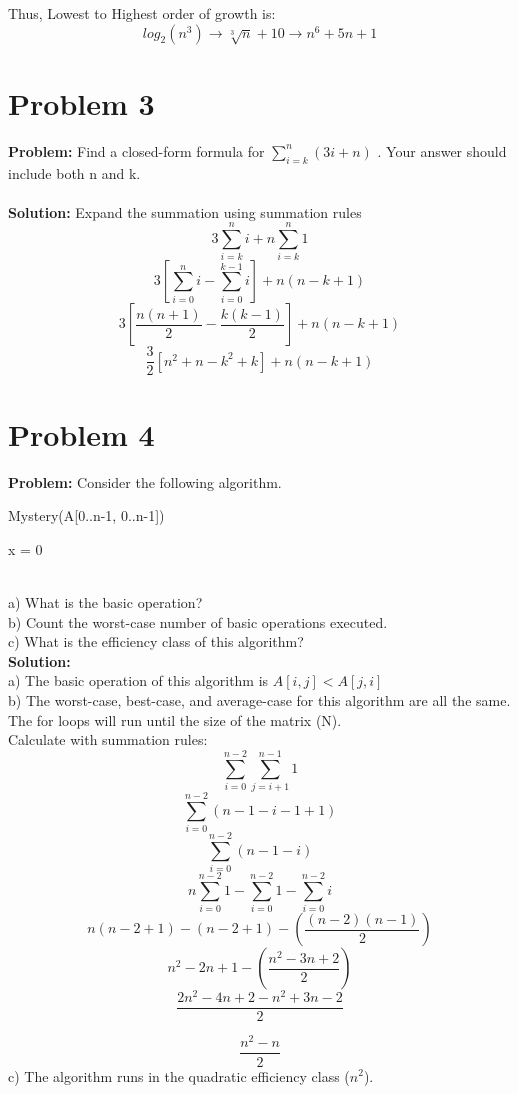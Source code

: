 \documentclass{article}
\begin{document}
Thus, Lowest to Highest order of growth is: \[log_2(n^3) \to \sqrt[3]{n} + 10 \to n^6 +5n +1\]

\section{Problem 3}
\textbf{Problem: }
Find a closed-form formula for $\sum_{i=k}^{n} (3i+n)$ . Your answer should include both n and k. \\
\\
\textbf{Solution: }
Expand the summation using summation rules
\[3 \sum_{i=k}^{n} i + n \sum_{i=k}^{n} 1 \]
\[3[\sum_{i=0}^{n}i - \sum_{i=0}^{k-1}i ] + n(n-k+1) \]
\[3[\frac{n(n+1)}{2} - \frac{k(k-1)}{2}] + n(n-k+1)\]
\[
\boxed
{\frac{3}{2}[n^2 + n - k^2 + k] + n(n-k+1)}
\]

\section{Problem 4}
\textbf{Problem: }
Consider the following algorithm.\\
\begin{algorithm}
\caption{Mystery(A[0..n-1, 0..n-1])}
x = 0 \\
\end{algorithm} \\
a) What is the basic operation? \\
b) Count the worst-case number of basic operations executed.\\
c) What is the efficiency class of this algorithm?\\
\textbf{Solution: }\\
a) The basic operation of this algorithm is $A[i,j] < A[j,i]$\\
b) The worst-case, best-case, and average-case for this algorithm are all the same. The for loops will run until the size of the matrix (N). \\
    Calculate with summation rules:
    \[\sum_{i=0}^{n-2} \sum_{j=i+1}^{n-1} 1\]
    \[\sum_{i=0}^{n-2} (n-1-i-1+1)\]
    \[\sum_{i=0}^{n-2} (n-1-i)\]
    \[n\sum_{i=0}^{n-2} 1 - \sum_{i=0}^{n-2} 1 - \sum_{i=0}^{n-2} i\]
    \[n(n-2+1) - (n-2+1) - (\frac{(n-2)(n-1)}{2})\]
    \[n^2 - 2n + 1 - (\frac{n^2 - 3n + 2}{2})\]
    \[\frac{2n^2 - 4n + 2 - n^2 + 3n - 2}{2}\]
    
    \[
    \boxed
    {\frac{n^2 - n}{2}}
    \]
c) The algorithm runs in the quadratic efficiency class ($n^2$).\\
\end{document}
